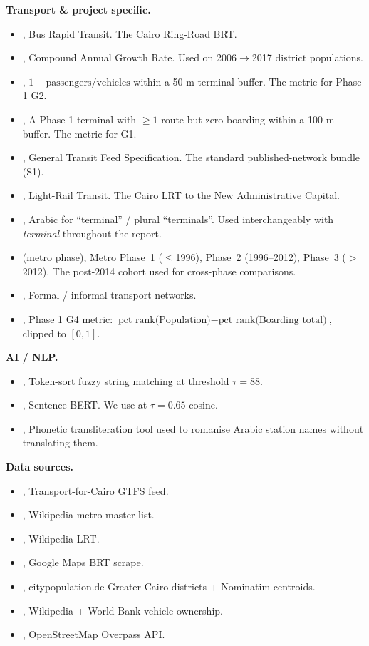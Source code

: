 \textbf{Transport \& project specific.}

\begin{itemize}
 \item {}, Bus Rapid Transit. The Cairo Ring-Road BRT.
 \item {}, Compound Annual Growth Rate. Used on 2006$\to$2017
 district populations.
 \item {}, $1 - \text{passengers}/\text{vehicles}$
 within a 50-m terminal buffer. The metric for Phase 1 G2.
 \item {}, A Phase 1 terminal with $\geq 1$ route
 but zero boarding within a 100-m buffer. The metric for G1.
 \item {}, General Transit Feed Specification. The standard
 published-network bundle (S1).
 \item {}, Light-Rail Transit. The Cairo LRT to the New
 Administrative Capital.
 \item {}, Arabic for ``terminal'' / plural
 ``terminals''. Used interchangeably with \emph{terminal}
 throughout the report.
 \item {} (metro phase), Metro Phase~1 ($\le$1996),
 Phase~2 (1996--2012), Phase~3 ($>$2012). The post-2014 cohort
 used for cross-phase comparisons.
 \item {}, Formal / informal transport networks.
 \item {}, Phase 1 G4 metric:
 $\text{pct\_rank(Population)} - \text{pct\_rank(Boarding total)}$,
 clipped to $[0, 1]$.
\end{itemize}

\textbf{AI / NLP.}

\begin{itemize}
 \item {}, Token-sort fuzzy string matching at
 threshold $\tau = 88$.
 \item {}, Sentence-BERT. We use
 at $\tau = 0.65$ cosine.
 \item {}, Phonetic transliteration tool used to romanise
 Arabic station names without translating them.
\end{itemize}

\textbf{Data sources.}

\begin{itemize}
 \item {}, Transport-for-Cairo GTFS feed.
 \item {}, Wikipedia metro master list.
 \item {}, Wikipedia LRT.
 \item {}, Google Maps BRT scrape.
 \item {}, citypopulation.de Greater Cairo districts +
 Nominatim centroids.
 \item {}, Wikipedia + World Bank vehicle ownership.
 \item {}, OpenStreetMap Overpass API.
\end{itemize}
